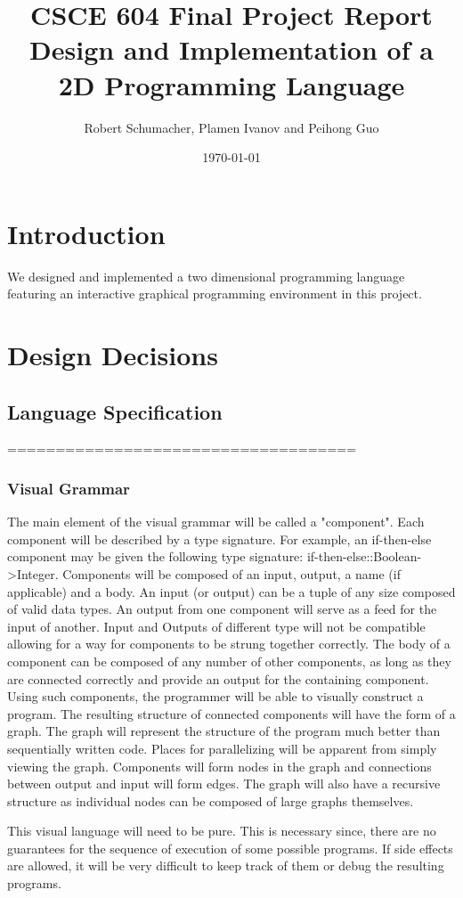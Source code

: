 \documentclass[12pt,UTF8,a4]{article}
\title{CSCE 604 Final Project Report \\ Design and Implementation of a 2D Programming Language}
\author{Robert Schumacher, Plamen Ivanov and Peihong Guo}
\date{\today}
\begin{document}
\maketitle
\singlespacing

\section{Introduction}
We designed and implemented a two dimensional programming language featuring an interactive graphical programming environment in this project.

\section{Design Decisions}
\subsection{Language Specification}
====================================
\subsubsection{Visual Grammar}
The main element of the visual grammar will be called a "component". Each component will be described by a type signature. For example, an if-then-else component may be given the following type signature:
 if-then-else::Boolean->Integer. Components will be composed of an input, output, a name (if applicable) and a body.
 An input (or output) can be a tuple of any size composed of valid data types. An output from one component will serve as a feed for the 
input of another. Input and Outputs of different type will not be compatible allowing for a way for components to be strung together correctly.
 The body of a component can be composed of any number of other components, as long as they are connected correctly and provide an output for 
the containing component. Using such components, the programmer will be able to visually construct a program. The resulting structure of connected components will have the form of a graph. The graph will represent the structure of the program much better than sequentially written code.
 Places for parallelizing will be apparent from simply viewing the graph. Components will form nodes in the graph and connections between output and input will form edges. The graph will also have a recursive structure as individual nodes can be composed of large graphs themselves.

This visual language will need to be pure. This is necessary since, there are no guarantees for the sequence of execution of some possible programs. If side effects are allowed, it will be very difficult to keep track of them or debug the resulting programs.
\end{document}
